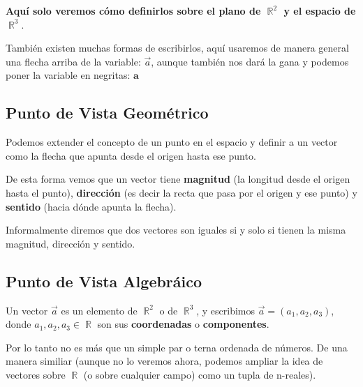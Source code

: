 \documentclass[12pt, fleqn]{report}                             %
\theoremstyle{break}                                            %
\DeclareMathOperator \Reals        {\mathbb{R}}                 %
\newcommand{\bVec}[1]{\mathbf{#1}}                              %
\begin{document}
            \textbf{Aquí solo veremos cómo definirlos sobre el plano de $\Reals^2$ y el espacio de $\Reals^3$}.

            También existen muchas formas de escribirlos, aquí usaremos de manera general una flecha
            arriba de la variable: $\vec{a}$, aunque también nos dará la gana y podemos poner la
            variable en negritas: $\bVec{a}$

            \subsection{Punto de Vista Geométrico}
            
                Podemos extender el concepto de un punto en el espacio y definir a un vector
                como la flecha que apunta desde el origen hasta ese punto.

                De esta forma vemos que un vector tiene \textbf{magnitud} (la longitud desde
                el origen hasta el punto), \textbf{dirección} (es decir la recta que pasa por
                el origen y ese punto) y \textbf{sentido} (hacia dónde apunta la flecha).
                
                Informalmente diremos que dos vectores son iguales si y solo si tienen la misma
                magnitud, dirección y sentido.
                
            \subsection{Punto de Vista Algebráico}
            
                Un vector $\vec{a}$ es un elemento de $\Reals^2$ o de $\Reals^3$, y escribimos
                $\vec{a} = (a_1, a_2, a_3)$, donde $a_1, a_2, a_3 \in \Reals$ son sus
                \textbf{coordenadas} o \textbf{componentes}.

                Por lo tanto no es más que un simple par o terna ordenada de números. 
                De una manera similiar (aunque no lo veremos ahora, podemos ampliar la idea de vectores
                sobre $\Reals$ (o sobre cualquier campo) como un tupla de n-reales).
\end{document}
